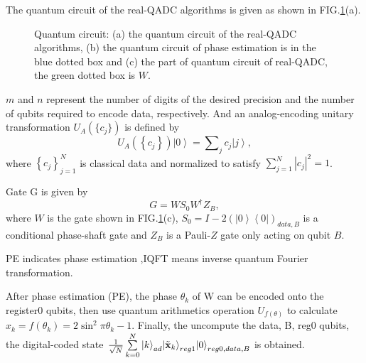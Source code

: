 \documentclass[%
 reprint,
 amsmath,amssymb,
pra,
]{revtex4-1}
\begin{document}
The quantum circuit of the real-QADC algorithms is given as shown in FIG.\ref{QADC_fig}(a).

\begin{figure}[htbp]
 \caption{Quantum circuit: (a) the quantum circuit of the real-QADC algorithms, 
 (b) the quantum circuit of phase estimation is in the blue dotted box
 and (c) the part of quantum circuit of real-QADC, the green dotted box is $W$.}
 \label{QADC_fig}
\end{figure}

$m$ and $n$ represent the number of digits of the desired precision and the number of qubits required to encode data, respectively.
And an analog-encoding unitary transformation $U_A(\{c_j\})$ is defined by
$${U_A}\left( {\left\{ {{c_j}} \right\}} \right)\left| 0 \right\rangle  = \sum\nolimits_j {{c_j}\left| j \right\rangle },$$
where $\left\{ {{c_j}} \right\}_{j = 1}^N$ is classical data and normalized to satisfy $\sum\nolimits_{j = 1}^N {{{\left| {{c_j}} \right|}^2}}  = 1$.

Gate G is given by
$$G = W{S_0}{W^\dag }{Z_B},$$
where $W$ is the gate shown in FIG.\ref{QADC_fig}(c), ${S_0} = I - 2{\left( {\left| 0 \right\rangle \left\langle 0 \right|} \right)_{data,B}}$
is a conditional phase-shaft gate and ${Z_B}$ is a Pauli-$Z$ gate only acting on qubit $B$.

PE indicates phase estimation ,IQFT means inverse quantum Fourier transformation\cite{nielsen_quantum_2002}.

After phase estimation (PE), the phase ${\theta _k}$ of W can be encoded onto the register0 qubits, then use quantum arithmetics operation ${U_{f\left( \theta  \right)}}$ to calculate
${x_k} = f\left( {{\theta _k}} \right) = 2{\sin ^2}\pi {\theta _k} - 1$.
Finally, the uncompute the data, B, reg0 qubits, the digital-coded state
$\frac{1}{{\sqrt N }}\sum\limits_{k = 0}^N {{{\left| k \right\rangle }_{ad}}{{\left| {{{\tilde {\textbf x}}_k}} \right\rangle }_{reg1}}{{\left| 0 \right\rangle }_{reg0,data,B}}} $
is obtained.
\end{document}
